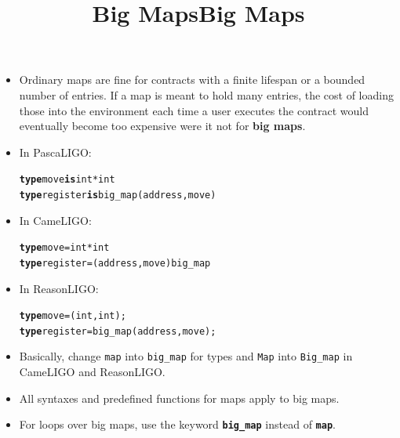 \documentclass[wide]{slides}
\newcommand{\Kis}[0]{\textbf{is}\xspace}
\newcommand{\Ktype}[0]{\textbf{type}\xspace}
\begin{document}
\begin{slide}
  \title{Big Maps}

  \begin{itemize}

    \item Ordinary maps are fine for contracts with a finite lifespan
      or a bounded number of entries. If a map is meant to hold many
      entries, the cost of loading those into the environment each
      time a user executes the contract would eventually become too
      expensive were it not for \textbf{big maps}.

    \item In PascaLIGO:
      \begin{alltt}
\Ktype move \Kis int * int
\Ktype register \Kis big_map (address, move)
      \end{alltt}

    \item In CameLIGO:
      \begin{alltt}
\Ktype move = int * int
\Ktype register = (address, move) big_map
      \end{alltt}

    \item In ReasonLIGO:
      \begin{alltt}
\Ktype move = (int, int);
\Ktype register = big_map (address, move);
      \end{alltt}

  \end{itemize}

\end{slide}

\begin{slide}
  \title{Big Maps}

  \begin{itemize}

    \item Basically, change \texttt{map} into \texttt{big\_map} for
      types and \texttt{Map} into \texttt{Big\_map} in CameLIGO and
      ReasonLIGO.

    \item All syntaxes and predefined functions for maps apply to big
      maps.

    \item For loops over big maps, use the keyword
      \texttt{\textbf{big\_map}} instead of \texttt{\textbf{map}}.

  \end{itemize}

\end{slide}
\end{document}
